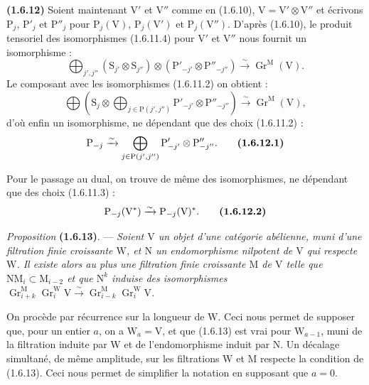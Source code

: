 \documentclass[11pt,leqno]{article}
\begin{document}
\textbf{(1.6.12)} Soient maintenant \(\mathrm{V}'\) et \(\mathrm{V}''\) comme en (1.6.10), \(\mathrm{V}=\mathrm{V}'\otimes\mathrm{V}''\) et écrivons \(\mathrm{P}_j\), \(\mathrm{P}'_j\) et \(\mathrm{P}''_j\) pour \(\mathrm{P}_j(\mathrm{V})\), \(\mathrm{P}_j(\mathrm{V}')\) et \(\mathrm{P}_j(\mathrm{V}'')\). D’après (1.6.10), le produit tensoriel des isomorphismes (1.6.11.4) pour \(\mathrm{V}'\) et \(\mathrm{V}''\) nous fournit un isomorphisme :
\[
\bigoplus_{j',j''}
(\mathrm{S}_{j'}\otimes\mathrm{S}_{j''})
\otimes(\mathrm{P}'_{-j'}\otimes\mathrm{P}''_{-j''})
\xrightarrow{\sim}\operatorname{Gr}^{\mathrm{M}}(\mathrm{V}).
\]
Le composant avec les isomorphismes (1.6.11.2) on obtient :
\[
\bigoplus
\left(\mathrm{S}_j\otimes
\bigoplus_{j\in\mathrm{P}(j',j'')}
\mathrm{P}'_{-j'}\otimes\mathrm{P}''_{-j''}\right)
\xrightarrow{\sim}\operatorname{Gr}^{\mathrm{M}}(\mathrm{V}),
\]
d’où enfin un isomorphisme, ne dépendant que des choix (1.6.11.2) :
\[
\mathrm{P}_{-j}\xrightarrow{\sim}
\bigoplus_{j\in\mathrm{P}(j',j'')}
\mathrm{P}'_{-j'}\otimes\mathrm{P}''_{-j''}.
\tag*{\textbf{(1.6.12.1)}}
\]

Pour le passage au dual, on trouve de même des isomorphismes, ne dépendant que des choix (1.6.11.3) :
\[
\mathrm{P}_{-j}(\mathrm{V}^*)\xrightarrow{\sim}\mathrm{P}_{-j}(\mathrm{V})^*.
\tag*{\textbf{(1.6.12.2)}}
\]

\textit{Proposition} \textbf{(1.6.13)}. — \textit{Soient \(\mathrm{V}\) un objet d’une catégorie abélienne, muni d’une filtration finie croissante \(\mathrm{W}\), et \(\mathrm{N}\) un endomorphisme nilpotent de \(\mathrm{V}\) qui respecte \(\mathrm{W}\). Il existe alors au plus une filtration finie croissante \(\mathrm{M}\) de \(\mathrm{V}\) telle que \(\mathrm{N}\mathrm{M}_i\subset\mathrm{M}_{i-2}\) et que \(\mathrm{N}^k\) induise des isomorphismes \(\operatorname{Gr}_{i+k}^{\mathrm{M}}\operatorname{Gr}_i^{\mathrm{W}}\mathrm{V}\xrightarrow{\sim}\operatorname{Gr}_{i-k}^{\mathrm{M}}\operatorname{Gr}_i^{\mathrm{W}}\mathrm{V}\).}

On procède par récurrence sur la longueur de \(\mathrm{W}\). Ceci nous permet de supposer que, pour un entier \(a\), on a \(\mathrm{W}_a=\mathrm{V}\), et que (1.6.13) est vrai pour \(\mathrm{W}_{a-1}\), muni de la filtration induite par \(\mathrm{W}\) et de l’endomorphisme induit par \(\mathrm{N}\). Un décalage simultané, de même amplitude, sur les filtrations \(\mathrm{W}\) et \(\mathrm{M}\) respecte la condition de (1.6.13). Ceci nous permet de simplifier la notation en supposant que \(a=0\).
\end{document}
